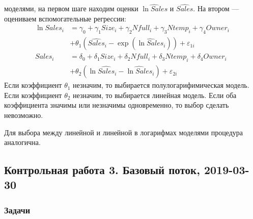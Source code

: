 \begin{enumerate}
\begin{enumerate}
  моделями, на первом шаге находим оценки $\widehat{\ln Sales}$ и
  $\widehat{Sales}$. На втором — оцениваем вспомогательные регрессии:
  \begin{align*}
    \ln Sales_i &= \gamma_0 + \gamma_1 Size_i + \gamma_2 Nfull_i +
    \gamma_3 Ntemp_i + \gamma_4 Owner_i \\
    &+ \theta_1 (\widehat{Sales}_i - \exp(\widehat{\ln Sales}_i)) +
    \varepsilon_{1i} \\
    Sales_i &= \delta_0 + \delta_1 Size_i + \delta_2 Nfull_i +
    \delta_3 Ntemp_i + \delta_4 Owner_i \\
    &+ \theta_2 (\ln \widehat{Sales}_i -\widehat{\ln Sales}_i) +
    \varepsilon_{2i}
  \end{align*}
  Если коэффициент $\theta_1$ незначим, то выбирается полулогарифимическая модель.
  Если коэффициент $\theta_2$ незначим, то выбирается линейная модель.
  Если оба коэффициента значимы или незначимы одновременно, то выбор сделать невозможно.

  Для выбора между линейной и линейной в логарифмах моделями процедура аналогична.
\end{enumerate}
\end{enumerate}


\subsection{Контрольная работа 3. Базовый поток, 2019-03-30}














\subsubsection*{Задачи}


